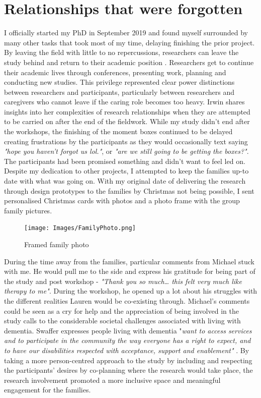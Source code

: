 \section{Relationships that were forgotten}
\label{Relationships:forgotten}
I officially started my PhD in September 2019 and found myself surrounded by many other tasks that took most of my time, delaying finishing the prior project. By leaving the field with little to no repercussions, researchers can leave the study behind and return to their academic position \citep{abulughod_can_1990, gottfried_beyond_2016, irwin_into_2006}. Researchers get to continue their academic lives through conferences, presenting work, planning and conducting new studies. This privilege represented clear power distinctions between researchers and participants, particularly between researchers and caregivers who cannot leave if the caring role becomes too heavy. Irwin shares insights into her complexities of research relationships when they are attempted to be carried on after the end of the fieldwork. While my study didn't end after the workshops, the finishing of the moment boxes continued to be delayed creating frustrations by the participants as they would occasionally text saying \textit{"hope you haven't forgot us lol."}, or \textit{"are we still going to be getting the boxes?"}. The participants had been promised something and didn't want to feel led on. Despite my dedication to other projects, I attempted to keep the families up-to date with what was going on. With my original date of delivering the research through design prototypes to the families by Christmas not being possible, I sent personalised Christmas cards with photos and a photo frame with the group family pictures. 
 

\begin{figure}
\centering
\texttt{[image: Images/FamilyPhoto.png]}
\caption{Framed family photo}
\label{fig:familyPhoto}
\end{figure}

During the time away from the families, particular comments from Michael stuck with me. He would pull me to the side and express his gratitude for being part of the study and post workshop - \textit{"Thank you so much… this felt very much like therapy to me"}. During the workshop, he opened up a lot about his struggles with the different realities Lauren would be co-existing through. Michael's comments could be seen as a cry for help and the appreciation of being involved in the study calls to the considerable societal challenges associated with living with dementia. Swaffer expresses people living with dementia "\textit{want to access services and to participate in the community the way everyone has a right to expect, and to have our disabilities respected with acceptance, support and enablement"} \citep{swaffer_dementia_2014}. By taking a more person-centred approach to the study by including and respecting the participants' desires by co-planning where the research would take place, the research involvement promoted a more inclusive space and meaningful engagement for the families. 
 
